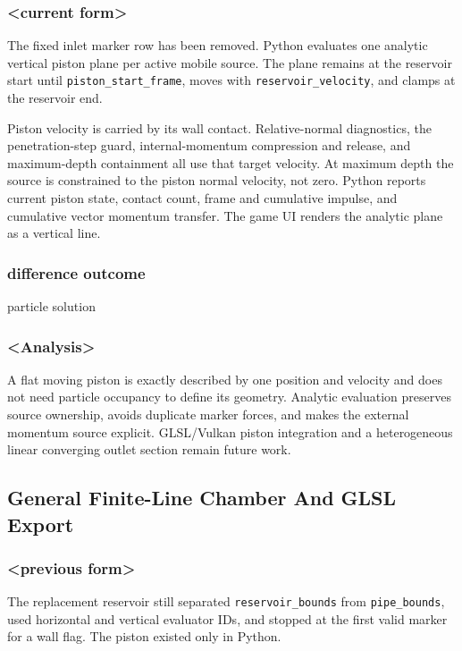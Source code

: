 \subsubsection{<current form>}

The fixed inlet marker row has been removed.  Python evaluates one analytic
vertical piston plane per active mobile source.  The plane remains at the
reservoir start until \texttt{piston\_start\_frame}, moves with
\texttt{reservoir\_velocity}, and clamps at the reservoir end.

Piston velocity is carried by its wall contact.  Relative-normal diagnostics,
the penetration-step guard, internal-momentum compression and release, and
maximum-depth containment all use that target velocity.  At maximum depth the
source is constrained to the piston normal velocity, not zero.  Python reports
current piston state, contact count, frame and cumulative impulse, and
cumulative vector momentum transfer.  The game UI renders the analytic plane
as a vertical line.

\subsubsection{difference outcome}

particle solution

\subsubsection{<Analysis>}

A flat moving piston is exactly described by one position and velocity and
does not need particle occupancy to define its geometry.  Analytic evaluation
preserves source ownership, avoids duplicate marker forces, and makes the
external momentum source explicit.  GLSL/Vulkan piston integration and a
heterogeneous linear converging outlet section remain future work.

\subsection{General Finite-Line Chamber And GLSL Export}

\subsubsection{<previous form>}

The replacement reservoir still separated \texttt{reservoir\_bounds} from
\texttt{pipe\_bounds}, used horizontal and vertical evaluator IDs, and stopped
at the first valid marker for a wall flag.  The piston existed only in Python.

